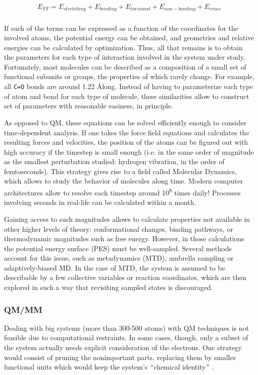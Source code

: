  \begin{align}
	E_{FF}=E_{stretching}+E_{bending}+E_{torsional}+E_{non-bonding}+E_{cross} \\ \tag{Force field energy}
\end{align}

If each of the terms can be expressed as a function of the coordinates for the involved atoms, the potential energy can be obtained, and geometries and relative energies can be calculated by optimization. Thus, all that remains is to obtain the parameters for each type of interaction involved in the system under study. Fortunately, most molecules can be described as a composition of a small set of functional subunits or groups, the properties of which rarely change. For example, all \texttt{C=O} bonds are around 1.22 \AA long. Instead of having to parameterize each type of atom and bond for each type of molecule, these similarities allow to construct set of parameters with reasonable easiness, in principle.

As opposed to QM, these equations can be solved efficiently enough to consider time-dependent analysis. If one takes the force field equations and calculates the resulting forces and velocities, the position of the atoms can be figured out with high accuracy if the timestep is small enough (i.e. in the same order of magnitude as the smallest perturbation studied: hydrogen vibration, in the order of femtoseconds). This strategy gives rise to a field called Molecular Dynamics, which allows to study the behavior of molecules along time. Modern computer architectures allow to resolve each timestep around 10\textsuperscript{8 }times daily! Processes involving seconds in real-life can be calculated within a month.

Gaining access to such magnitudes allows to calculate properties not available in other higher levels of theory: conformational changes, binding pathways, or thermodynamic magnitudes such as free energy. However, in those calculations the potential energy surface (PES) must be well-sampled. Several methods account for this issue, such as metadynamics (MTD), umbrella sampling or adaptively-biased MD. In the case of MTD, the system is assumed to be describable by a few collective variables or reaction coordinates, which are then explored in such a way that revisiting sampled states is discouraged.

\subsubsection{QM/MM}
Dealing with big systems (more than 300-500 atoms) with QM techniques is not feasible due to computational restraints. In some cases, though, only a subset of the system actually needs explicit consideration of the electrons. One strategy would consist of pruning the nonimportant parts, replacing them by smaller functional units which would keep the system’s $``$chemical identity$"$ .

